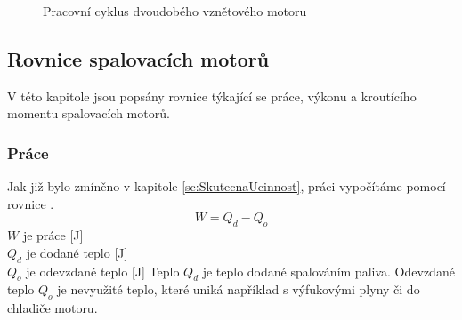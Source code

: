 \begin{figure}[H]
    
    \caption{Pracovní cyklus dvoudobého vznětového motoru \jaDiag}
    \label{obr:PracovniCyklusDvoudobehoVznetovehoMotoru}
\end{figure}

\newpage

\subsection{Rovnice spalovacích motorů}
{V této kapitole jsou popsány rovnice týkající se práce, výkonu a kroutícího momentu spalovacích motorů.}
\subsubsection{Práce}
{Jak již bylo zmíněno v kapitole \ref{sc:SkutecnaUcinnost}, práci vypočítáme pomocí rovnice .}
\cite{NCEPU:ThermalEfficiencyForHeatEngines}
\begin{equation}\label{rv:prace2}
    W=Q_d-Q_o
\end{equation}
{\(W\) je práce [J]}\\
{\(Q_d\) je dodané teplo [J]}\\
{\(Q_o\) je odevzdané teplo  [J]}\odst
{Teplo \(Q_d\) je teplo dodané spalováním paliva. Odevzdané teplo \(Q_o\) je nevyužité teplo, které uniká například s výfukovými plyny či do chladiče motoru.}
